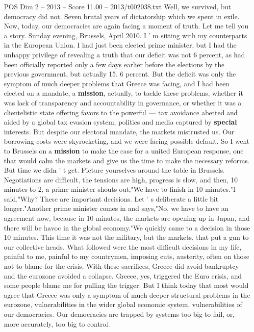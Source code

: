 \begin{textsample}{POS Dim 2 – 2013 – Score 11.00 – 2013/t002038.txt}
Well, we survived, but democracy did not.
Seven brutal years of dictatorship which we spent in exile.
Now, today, our democracies are again facing a moment of truth.
Let me tell you a story.
Sunday evening, Brussels, April 2010.
I ' m sitting with my counterparts in the European Union.
I had just been elected prime minister, but I had the unhappy privilege of revealing a truth that our deficit was not 6 percent, as had been officially reported only a few days earlier before the elections by the previous government, but actually 15. 6 percent.
But the deficit was only the symptom of much deeper problems that Greece was facing, and I had been elected on a mandate, a \textbf{mission}, actually, to tackle these problems, whether it was lack of transparency and accountability in governance, or whether it was a clientelistic state offering favors to the powerful — tax avoidance abetted and aided by a global tax evasion system, politics and media captured by \textbf{special} interests.
But despite our electoral mandate, the markets mistrusted us.
Our borrowing costs were skyrocketing, and we were facing possible default.
So I went to Brussels on a \textbf{mission} to make the case for a united European response, one that would calm the markets and give us the time to make the necessary reforms.
But time we didn ' t get.
Picture yourselves around the table in Brussels.
Negotiations are difficult, the tensions are high, progress is slow, and then, 10 minutes to 2, a prime minister shouts out,"We have to finish in 10 minutes."I said,"Why?
These are important decisions.
Let ' s deliberate a little bit longer."Another prime minister comes in and says,"No, we have to have an agreement now, because in 10 minutes, the markets are opening up in Japan, and there will be havoc in the global economy."We quickly came to a decision in those 10 minutes.
This time it was not the military, but the markets, that put a gun to our collective heads.
What followed were the most difficult decisions in my life, painful to me, painful to my countrymen, imposing cuts, austerity, often on those not to blame for the crisis.
With these sacrifices, Greece did avoid bankruptcy and the eurozone avoided a collapse.
Greece, yes, triggered the Euro crisis, and some people blame me for pulling the trigger.
But I think today that most would agree that Greece was only a symptom of much deeper structural problems in the eurozone, vulnerabilities in the wider global economic system, vulnerabilities of our democracies.
Our democracies are trapped by systems too big to fail, or, more accurately, too big to control.

\end{textsample}
